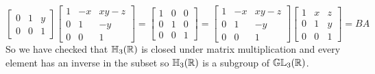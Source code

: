 \documentclass[11pt]{article}
\begin{document}
{$$\begin{bmatrix}
            0 & 1 & y \\
            0 & 0 & 1
        \end{bmatrix}
        \begin{bmatrix}
            1 & -x & xy-z \\
            0 & 1 & -y \\
            0 & 0 & 1
        \end{bmatrix}
        =
        \begin{bmatrix}
            1 & 0 & 0 \\
            0 & 1 & 0 \\
            0 & 0 & 1
        \end{bmatrix}
        =
        \begin{bmatrix}
            1 & -x & xy-z \\
            0 & 1 & -y \\
            0 & 0 & 1
        \end{bmatrix}
        \begin{bmatrix}
            1 & x & z \\
            0 & 1 & y \\
            0 & 0 & 1
        \end{bmatrix}
        = BA
        $$
        So we have checked that $\mathbb{H} _3 (\mathbb{R})$ is closed under matrix multiplication and every element has an inverse in the subset so $\mathbb{H} _3 (\mathbb{R})$ is a subgroup of $\mathbb{G}\mathbb{L} _3 (\mathbb{R})$.
    }


\newpage
\end{document}
